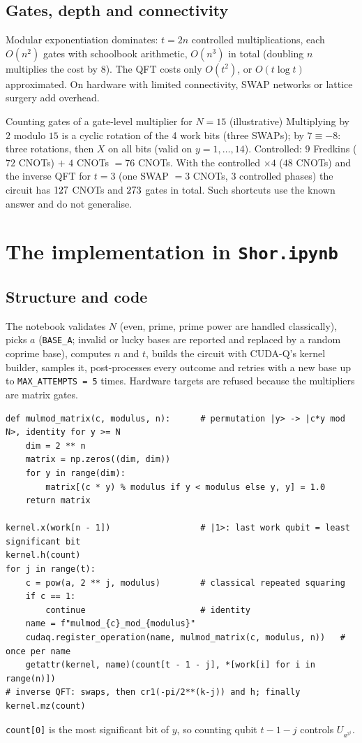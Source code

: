 \documentclass[11pt,a4paper,openany]{book}
\newcounter{wex}[chapter]
\begin{document}
\subsection{Gates, depth and connectivity}
Modular exponentiation dominates: $t = 2n$ controlled multiplications, each $O(n^2)$ gates with schoolbook arithmetic, $O(n^3)$ in total (doubling $n$
multiplies the cost by $8$). The QFT costs only $O(t^2)$, or $O(t\log t)$ approximated. On hardware with limited connectivity, SWAP networks or lattice
surgery add overhead.
\begin{wexample}{Counting gates of a gate-level multiplier for $N = 15$ (illustrative)}
Multiplying by $2$ modulo $15$ is a cyclic rotation of the 4 work bits (three SWAPs); by $7 \equiv -8$: three rotations, then $X$ on all bits (valid on
$y = 1, \dots, 14$). Controlled: $9$ Fredkins ($72$ CNOTs) $+$ $4$ CNOTs $= 76$ CNOTs. With the controlled $\times4$ ($48$ CNOTs) and the inverse QFT for $t = 3$ (one
SWAP $= 3$ CNOTs, $3$ controlled phases) the circuit has $127$ CNOTs and $273$ gates in total. Such shortcuts use the known answer and do not generalise.
\end{wexample}

\section{The implementation in \texttt{Shor.ipynb}}
\subsection{Structure and code}
The notebook validates $N$ (even, prime, prime power are handled classically), picks $a$ (\texttt{BASE\_A}; invalid or lucky bases are reported and
replaced by a random coprime base), computes $n$ and $t$, builds the circuit with CUDA-Q's kernel builder, samples it, post-processes every outcome and
retries with a new base up to \texttt{MAX\_ATTEMPTS = 5} times. Hardware targets are refused because the multipliers are matrix gates.
\begin{lstlisting}
def mulmod_matrix(c, modulus, n):      # permutation |y> -> |c*y mod N>, identity for y >= N
    dim = 2 ** n
    matrix = np.zeros((dim, dim))
    for y in range(dim):
        matrix[(c * y) % modulus if y < modulus else y, y] = 1.0
    return matrix

kernel.x(work[n - 1])                  # |1>: last work qubit = least significant bit
kernel.h(count)
for j in range(t):
    c = pow(a, 2 ** j, modulus)        # classical repeated squaring
    if c == 1:
        continue                       # identity
    name = f"mulmod_{c}_mod_{modulus}"
    cudaq.register_operation(name, mulmod_matrix(c, modulus, n))   # once per name
    getattr(kernel, name)(count[t - 1 - j], *[work[i] for i in range(n)])
# inverse QFT: swaps, then cr1(-pi/2**(k-j)) and h; finally kernel.mz(count)
\end{lstlisting}
\texttt{count[0]} is the most significant bit of $y$, so counting qubit $t - 1 - j$ controls $U_{a^{2^j}}$.
\end{document}
